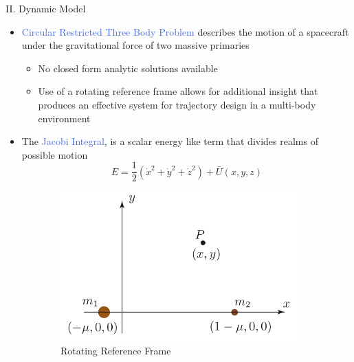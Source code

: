 \documentclass[final, usenames, dvipsnames]{beamer}
\newlength{\onecolwidth}
\def\Emph{\textcolor{RoyalBlue}}
\begin{document}
\begin{frame}[t]
\begin{columns}[T,onlytextwidth]
\begin{column}{\onecolwidth}
\begin{block}{II. Dynamic Model} %
	\begin{itemize}
		\item \Emph{Circular Restricted Three Body Problem} describes the motion of a spacecraft under the gravitational force of two massive primaries
			\begin{itemize}
				\item No closed form analytic solutions available
				\item Use of a rotating reference frame allows for additional insight that produces an effective system for trajectory design in a multi-body environment  
			\end{itemize}
			
		\item The \Emph{Jacobi Integral}, is a scalar energy like term that divides realms of possible motion
			 \begin{equation*}
			 	E = \frac{1}{2} \left( \dot{x}^2 + \dot{y}^2 + \dot{z}^2 \right) + \bar{U}(x,y,z)
			 \end{equation*}
	\end{itemize}
	\begin{figure}
		\begin{subfigure}[b]{0.45\columnwidth}
			 \includegraphics[width = \columnwidth]{rotating_ref_frame}
			\caption*{Rotating Reference Frame\label{fig:rotating_ref_frame}}
		\end{subfigure}%
		\quad%
		\begin{subfigure}[b]{0.45\columnwidth}

\end{subfigure}
\end{figure}
\end{block}
\end{column}
\end{columns}
\end{frame}
\end{document}
